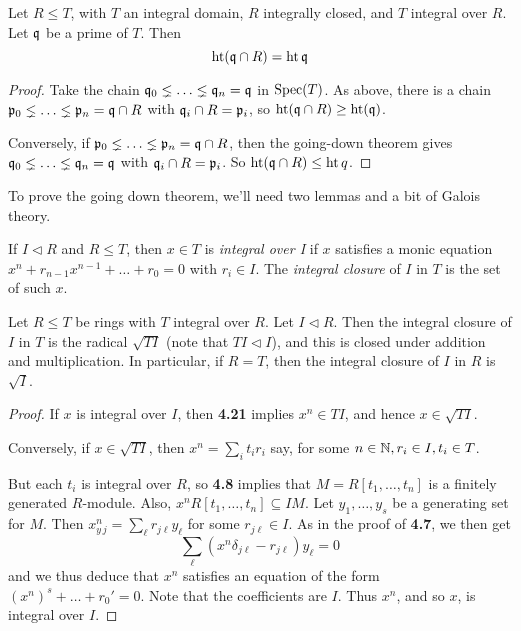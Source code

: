 \documentclass[10pt,a4paper]{article}
\begin{document}
\begin{corollary}
  Let $R \leq T$, with $T$ an integral domain, $R$ integrally closed, and $T$ integral over $R$. Let $\mathfrak{q}$ be a prime of $T$. Then
  \[\operatorname{ht}(\mathfrak{q}\cap R) = \operatorname{ht}{\mathfrak{q}}\]
\end{corollary}
\begin{proof}
  Take the chain $\mathfrak{q}_0 \lneq \ldots \lneq \mathfrak{q}_n = \mathfrak{q}$ in $\operatorname{Spec}(T)$. As above, there is a chain $\mathfrak{p}_0 \lneq \ldots \lneq \mathfrak{p}_n = \mathfrak{q}\cap R$ with $\mathfrak{q}_i \cap R = \mathfrak{p}_i$, so $\operatorname{ht}(\mathfrak{q}\cap R) \geq \operatorname{ht}(\mathfrak{q})$.

  Conversely, if $\mathfrak{p}_0 \lneq \ldots \lneq \mathfrak{p}_n = \mathfrak{q}\cap R$, then the going-down theorem gives $\mathfrak{q}_0 \lneq \ldots \lneq \mathfrak{q}_n = \mathfrak{q}$ with $\mathfrak{q}_i \cap R = \mathfrak{p}_i$. So $\operatorname{ht}(\mathfrak{q}\cap R) \leq \operatorname{ht}{q}$.
\end{proof}
To prove the going down theorem, we'll need two lemmas and a bit of Galois theory.
\begin{definition}
  If $I \triangleleft R$ and $R \leq T$, then $x \in T$ is \emph{integral over I} if $x$ satisfies a monic equation $x^n+r_{n-1}x^{n-1} + \ldots +r_0 = 0$ with $r_i \in I$. The \emph{integral closure} of $I$ in $T$ is the set of such $x$.
\end{definition}
\begin{lemma}
  Let $R \leq T$ be rings with $T$ integral over $R$. Let $I \triangleleft R$. Then the integral closure of $I$ in $T$ is the radical $\sqrt{TI}$ (note that $TI \triangleleft I$), and this is closed under addition and multiplication. In particular, if $R = T$, then the integral closure of $I$ in $R$ is $\sqrt{I}$.
\end{lemma}
\begin{proof}
  If $x$ is integral over $I$, then \textbf{4.21} implies $x^n \in TI$, and hence $x \in \sqrt{TI}$.

  Conversely, if $x \in \sqrt{TI}$, then $x^n = \sum_{i} t_i r_i$ say, for some $n \in \mathbb{N}, r_i \in I, t_i \in T$.

  But each $t_i$ is integral over $R$, so \textbf{4.8} implies that $M = R[t_1, \ldots, t_n]$ is a finitely generated $R$-module. Also, $x^n R[t_1, \ldots, t_n] \subseteq IM$. Let $y_1, \ldots, y_s$ be a generating set for $M$. Then $x^n_y_j = \sum_\ell r_{j\ell} y_\ell$ for some $r_{j\ell} \in I$. As in the proof of \textbf{4.7}, we then get
  \[\sum_\ell (x^n\delta_{j\ell} - r_{j\ell})y_\ell = 0\]
  and we thus deduce that $x^n$ satisfies an equation of the form $(x^n)^s + \ldots +r_0'=0$. Note that the coefficients are $I$. Thus $x^n$, and so $x$, is integral over $I$.
\end{proof}
\end{document}
